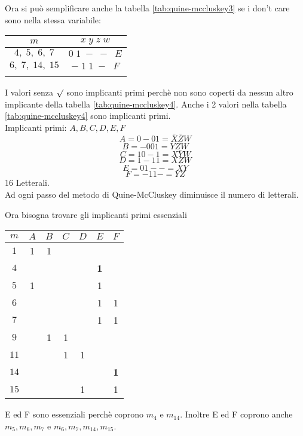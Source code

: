 \documentclass[a4paper]{article}
\theoremstyle{break}
\theoremstyle{break}
\theoremstyle{break}
\theoremstyle{break}
\begin{document}
\begin{example}
   Ora si può semplificare anche la tabella \ref{tab:quine-mccluskey3} se i don't care
   sono nella stessa variabile:
            \begin{center}
       \begin{tabular}{c|c}
           \( m \) & \( x\;y\;z\;w \)\\
           \hline
           \( 4,\; 5, \;6, \;7 \) & \( 0\;1\;-\;-\;\;E \)\\ 
           \( 6, \;7, \;14, \;15 \) & \( -\;1\;1\;-\;\;F \)\\
    \label{tab:quine-mccluskey4}
    \end{tabular}
   \end{center}
   I valori senza \( \surd \) sono implicanti primi perchè non sono coperti da nessun altro implicante
   della tabella \ref{tab:quine-mccluskey4}. Anche i 2 valori nella tabella \ref{tab:quine-mccluskey4} sono
   implicanti primi.\\
   Implicanti primi: \( A,B,C,D,E,F \)
   \[
   A=0-01=\bar{X}\bar{Z}W
\]
   \[
       B=-001=\bar{Y}\bar{Z}W
   \]
   \[
       C=10-1=X\bar{Y}W
   \]
   \[
       D=1-11=XZW
   \]
   \[
       E=01--=\bar{X}Y
   \]
   \[
       F=-11-=YZ
   \]
   16 Letterali.\\
Ad ogni passo del metodo di Quine-McCluskey diminuisce il numero di letterali.

Ora bisogna trovare gli implicanti primi essenziali
\begin{center}
    \begin{tabular}{c|c|c|c|c|c|c}
        \( m \) & \( A \) & \( B \) & \( C \) & \( D \) & \( E \) & \( F \)\\ 
        \hline
        \( 1 \) & 1 & 1 &  &  &  &   \\
        \( 4 \) &  &  &  &  & \textbf{1} &   \\
        \( 5 \) & 1 &  &  &  & 1 &   \\
        \( 6 \) &  &  &  &  & 1 & 1  \\
        \( 7 \) &  &  &  &  & 1 & 1  \\
        \( 9 \) &  & 1 & 1 &  &  &   \\
        \( 11 \) &  &  & 1 & 1 &  &  \\
        \( 14 \) &  &  &  &  &  & \textbf{1}  \\
        \( 15 \) &  &  &  & 1 &  & 1  \\
    \end{tabular}
\end{center}
E ed F sono essenziali perchè coprono \( m_4 \) e \( m_{14} \). Inoltre E ed F coprono
anche \( m_5, m_6, m_7 \) e \( m_6, m_7, m_{14}, m_{15} \).  


\end{example}
\end{document}
